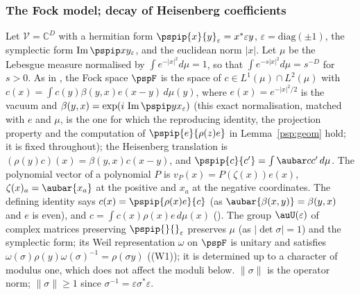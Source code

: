 \documentclass[10pt]{amsart}
\theoremstyle{definition}
\theoremstyle{remark}
\newcommand{\C}{\mathbb C}
\newcommand{\Iml}{\operatorname{Im}}
\begin{document}
\subsubsection{The Fock model; decay of Heisenberg coefficients}\label{psp:ss-fock}

Let $\mathcal V=\C^D$ with a hermitian form $\pspip{x}{y}_\varepsilon=x^*\varepsilon y$,
$\varepsilon=\mathrm{diag}(\pm1)$, the symplectic form $\Iml\pspip xy_\varepsilon$, and the euclidean
norm $|x|$. Let $\mu$ be the Lebesgue measure normalised by $\int e^{-|x|^2}d\mu=1$, so that
$\int e^{-s|x|^2}d\mu=s^{-D}$ for $s>0$. As in {\cite[Lemma~3.30]{P53}}, the Fock space $\pspF$ is the
space of $c\in L^1(\mu)\cap L^2(\mu)$ with $c(x)=\int c(y)\beta(y,x)e(x-y)\,d\mu(y)$, where
$e(x)=e^{-|x|^2/2}$ is the vacuum and $\beta(y,x)=\exp(i\,\Iml\pspip yx_\varepsilon)$ (this exact
normalisation, matched with $e$ and $\mu$, is the one for which the reproducing identity, the
projection property and the computation of $\pspip{e}{\rho(z)e}$ in Lemma~\ref{psp:geom} hold; it is
fixed throughout); the Heisenberg translation is
$(\rho(y)c)(x)=\beta(y,x)c(x-y)$, and $\pspip{c}{c'}=\int\aubar cc'\,d\mu$. The polynomial vector of a
polynomial $P$ is $v_P(x)=P(\zeta(x))e(x)$, $\zeta(x)_a=\aubar{x_a}$ at the positive and $x_a$ at the
negative coordinates. The defining identity says $c(x)=\pspip{\rho(x)e}{c}$ (as $\aubar{\beta(x,y)}=
\beta(y,x)$ and $e$ is even), and $c=\int c(x)\rho(x)e\,d\mu(x)$ ({\cite[Lemma~3.30]{P53}}). The group
$\auU(\varepsilon)$ of complex matrices preserving $\pspip{}{}_\varepsilon$ preserves $\mu$ (as
$|\det\sigma|=1$) and the symplectic form; its Weil representation $\omega$ on $\pspF$ is unitary
and satisfies $\omega(\sigma)\rho(y)\omega(\sigma)^{-1}=\rho(\sigma y)$ ((W1)); it is determined up to
a character of modulus one, which does not affect the moduli below. $\|\sigma\|$ is the operator
norm; $\|\sigma\|\ge1$ since $\sigma^{-1}=\varepsilon\sigma^*\varepsilon$.
\end{document}
